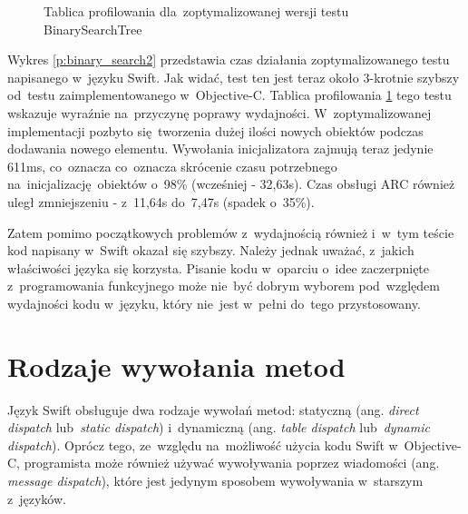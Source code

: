 \documentclass[mgr, shortabstract]{iithesis}
\newcommand{\ang}[1]{ang. \textit{#1}}
\begin{document}
\begin{figure}
    \caption{Tablica profilowania dla~zoptymalizowanej wersji testu BinarySearchTree}
    \label{i:binary_search2}
\end{figure}

Wykres \ref{p:binary_search2} przedstawia czas działania zoptymalizowanego testu napisanego w~języku Swift. Jak widać, test ten jest teraz około 3-krotnie szybszy od~testu zaimplementowanego w~Objective-C. Tablica profilowania \ref{i:binary_search2} tego testu wskazuje wyraźnie na~przyczynę poprawy wydajności. W~zoptymalizowanej implementacji pozbyto się tworzenia dużej ilości nowych obiektów podczas dodawania nowego elementu. Wywołania inicjalizatora zajmują teraz jedynie 611ms, co~oznacza co~oznacza skrócenie czasu potrzebnego na~inicjalizację obiektów o~98\% (wcześniej - 32,63s). Czas obsługi ARC również uległ zmniejszeniu - z~11,64s do~7,47s (spadek o~35\%). 

Zatem pomimo początkowych problemów z~wydajnością również i~w~tym teście kod napisany w~Swift okazał się szybszy. Należy jednak uważać, z~jakich właściwości języka się korzysta. Pisanie kodu w~oparciu o~idee zaczerpnięte z~programowania funkcyjnego może nie~być dobrym wyborem pod~względem wydajności kodu w~języku, który nie~jest w~pełni do~tego przystosowany.

\section{Rodzaje wywołania metod}
\label{s:wywolania_metod}

Język Swift obsługuje dwa rodzaje wywołań metod: statyczną (\ang{direct dispatch} lub~\textit{static dispatch}) i~dynamiczną (\ang{table dispatch} lub~\textit{dynamic dispatch}). Oprócz tego, ze~względu na~możliwość użycia kodu Swift w~Objective-C, programista może również używać wywoływania poprzez wiadomości (\ang{message dispatch}), które jest jedynym sposobem wywoływania w~starszym z~języków.
\end{document}
